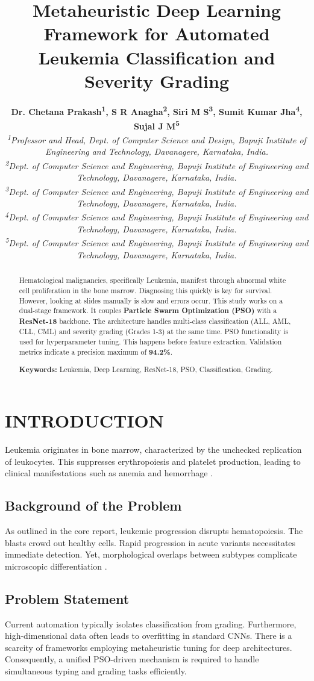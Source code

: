 \documentclass[12pt,a4paper]{article}
\title{\textbf{\Large Metaheuristic Deep Learning Framework for Automated Leukemia Classification and Severity Grading}}
\author{
    \textbf{Dr. Chetana Prakash\textsuperscript{1}, S R Anagha\textsuperscript{2}, Siri M S\textsuperscript{3}, Sumit Kumar Jha\textsuperscript{4}, Sujal J M\textsuperscript{5}} \\[1ex]
    \footnotesize \textit{\textsuperscript{1}Professor and Head, Dept. of Computer Science and Design, Bapuji Institute of Engineering and Technology, Davanagere, Karnataka, India.} \\
    \footnotesize \textit{\textsuperscript{2}Dept. of Computer Science and Engineering, Bapuji Institute of Engineering and Technology, Davanagere, Karnataka, India.} \\
    \footnotesize \textit{\textsuperscript{3}Dept. of Computer Science and Engineering, Bapuji Institute of Engineering and Technology, Davanagere, Karnataka, India.} \\
    \footnotesize \textit{\textsuperscript{4}Dept. of Computer Science and Engineering, Bapuji Institute of Engineering and Technology, Davanagere, Karnataka, India.} \\
    \footnotesize \textit{\textsuperscript{5}Dept. of Computer Science and Engineering, Bapuji Institute of Engineering and Technology, Davanagere, Karnataka, India.}
}
\date{}
\begin{document}
\maketitle
\vspace{-1cm}
\begin{abstract}
\noindent Hematological malignancies, specifically Leukemia, manifest through abnormal white cell proliferation in the bone marrow. Diagnosing this quickly is key for survival. However, looking at slides manually is slow and errors occur. This study works on a dual-stage framework. It couples \textbf{Particle Swarm Optimization (PSO)} with a \textbf{ResNet-18} backbone. The architecture handles multi-class classification (ALL, AML, CLL, CML) and severity grading (Grades 1-3) at the same time. PSO functionality is used for hyperparameter tuning. This happens before feature extraction. Validation metrics indicate a precision maximum of \textbf{94.2\%}.

\vspace{0.3cm}
\noindent \textbf{Keywords:} Leukemia, Deep Learning, ResNet-18, PSO, Classification, Grading.
\end{abstract}

\section{INTRODUCTION}
Leukemia originates in bone marrow, characterized by the unchecked replication of leukocytes. This suppresses erythropoiesis and platelet production, leading to clinical manifestations such as anemia and hemorrhage \cite{siegel2020}.

\subsection{Background of the Problem}
As outlined in the core report, leukemic progression disrupts hematopoiesis. The blasts crowd out healthy cells. Rapid progression in acute variants necessitates immediate detection. Yet, morphological overlaps between subtypes complicate microscopic differentiation \cite{rytting2015}.

\subsection{Problem Statement}
Current automation typically isolates classification from grading. Furthermore, high-dimensional data often leads to overfitting in standard CNNs. There is a scarcity of frameworks employing metaheuristic tuning for deep architectures. Consequently, a unified PSO-driven mechanism is required to handle simultaneous typing and grading tasks efficiently.
\end{document}
